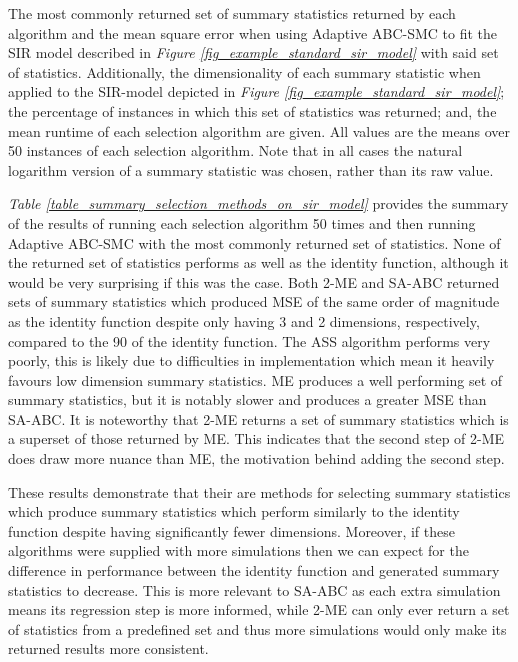 \documentclass[11pt,a4paper]{article}
\theoremstyle{break}
\begin{document}
\begin{table}[H]
    \caption{The most commonly returned set of summary statistics returned by each algorithm and the mean square error when using Adaptive ABC-SMC to fit the SIR model described in \textit{Figure \ref{fig_example_standard_sir_model}} with said set of statistics. Additionally, the dimensionality of each summary statistic when applied to the SIR-model depicted in \textit{Figure \ref{fig_example_standard_sir_model}}; the percentage of instances in which this set of statistics was returned; and, the mean runtime of each selection algorithm are given. All values are the means over 50 instances of each selection algorithm. Note that in all cases the natural logarithm version of a summary statistic was chosen, rather than its raw value.}
    \label{table_summary_selection_methods_on_sir_model}
  \end{table}

  \par \textit{Table \ref{table_summary_selection_methods_on_sir_model}} provides the summary of the results of running each selection algorithm 50 times and then running Adaptive ABC-SMC with the most commonly returned set of statistics. None of the returned set of statistics performs as well as the identity function, although it would be very surprising if this was the case. Both 2-ME and SA-ABC returned sets of summary statistics which produced MSE of the same order of magnitude as the identity function despite only having 3 and 2 dimensions, respectively, compared to the 90 of the identity function. The ASS algorithm performs very poorly, this is likely due to difficulties in implementation which mean it heavily favours low dimension summary statistics. ME produces a well performing set of summary statistics, but it is notably slower and produces a greater MSE than SA-ABC. It is noteworthy that 2-ME returns a set of summary statistics which is a superset of those returned by ME. This indicates that the second step of 2-ME does draw more nuance than ME, the motivation behind adding the second step.

  \par These results demonstrate that their are methods for selecting summary statistics which produce summary statistics which perform similarly to the identity function despite having significantly fewer dimensions. Moreover, if these algorithms were supplied with more simulations then we can expect for the difference in performance between the identity function and generated summary statistics to decrease. This is more relevant to SA-ABC as each extra simulation means its regression step is more informed, while 2-ME can only ever return a set of statistics from a predefined set and thus more simulations would only make its returned results more consistent.
\end{document}
